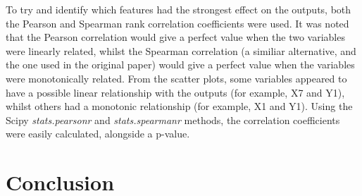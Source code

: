 \documentclass[12pt]{article}
\begin{document}
To try and identify which features had the strongest effect on the outputs, both the Pearson and Spearman rank correlation coefficients were used. It was noted that the Pearson correlation would give a perfect value when the two variables were linearly related, whilst the Spearman correlation (a similiar alternative, and the one used in the original paper) would give a perfect value when the variables were monotonically related. From the scatter plots, some variables appeared to have a possible linear relationship with the outputs (for example, X7 and Y1), whilst others had a monotonic relationship (for example, X1 and Y1). Using the Scipy \emph{stats.pearsonr} and \emph{stats.spearmanr} methods, the correlation coefficients were easily calculated, alongside a p-value.

\part*{Conclusion}



\end{document}
